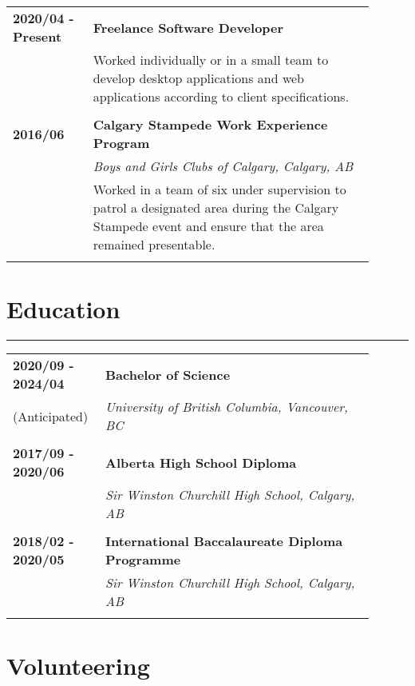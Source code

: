 \documentclass[letterpaper]{article}
\newcommand{\horizontalLine}{%
    \rule{\linewidth}{0.4pt}
    \vspace{1ex}
}
\begin{document}
        \begin{tabular}{p{0.2\linewidth} p{0.7\linewidth}} 
            \textbf{2020/04 - Present} & \large\textbf{Freelance Software Developer} \\
            & Worked individually or in a small team to develop desktop applications and web applications according to client specifications. \\
            \\
            \textbf{2016/06} & \large\textbf{Calgary Stampede Work Experience Program} \\
            & \emph{Boys and Girls Clubs of Calgary, Calgary, AB} \\
            & Worked in a team of six under supervision to patrol a designated area during the Calgary Stampede event and ensure that the area remained presentable. \\
            \\
        \end{tabular}

    \section*{Education}

        \horizontalLine

        \begin{tabular}{p{0.2\linewidth} p{0.7\linewidth}} 
            \textbf{2020/09 - 2024/04} & \large\textbf{Bachelor of Science} \\
            (Anticipated) & \emph{University of British Columbia, Vancouver, BC} \\
            \\
            \textbf{2017/09 - 2020/06} & \large\textbf{Alberta High School Diploma} \\
            & \emph{Sir Winston Churchill High School, Calgary, AB} \\
            \\
            \textbf{2018/02 - 2020/05} & \large\textbf{International Baccalaureate Diploma Programme} \\
            & \emph{Sir Winston Churchill High School, Calgary, AB} \\
            \\
        \end{tabular}

    \section*{Volunteering}
\end{document}
